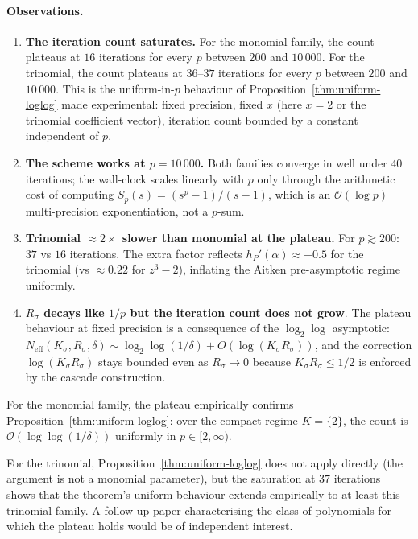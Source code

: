 \documentclass[11pt,a4paper]{article}
\theoremstyle{definition}
\begin{document}
\paragraph{Observations.}
\begin{enumerate}
  \item \textbf{The iteration count saturates.} For the monomial family, the count plateaus at $16$ iterations for every $p$ between $200$ and $10\,000$. For the trinomial, the count plateaus at $36$--$37$ iterations for every $p$ between $200$ and $10\,000$. This is the uniform-in-$p$ behaviour of Proposition~\ref{thm:uniform-loglog} made experimental: fixed precision, fixed $x$ (here $x = 2$ or the trinomial coefficient vector), iteration count bounded by a constant independent of $p$.
  \item \textbf{The scheme works at $p = 10\,000$.} Both families converge in well under $40$ iterations; the wall-clock scales linearly with $p$ only through the arithmetic cost of computing $S_p(s) = (s^p - 1)/(s - 1)$, which is an $\mathcal{O}(\log p)$ multi-precision exponentiation, not a $p$-sum.
  \item \textbf{Trinomial $\approx 2\times$ slower than monomial at the plateau.} For $p \gtrsim 200$: $37$ vs $16$ iterations. The extra factor reflects $h_P'(\alpha) \approx -0.5$ for the trinomial (vs $\approx 0.22$ for $z^3 - 2$), inflating the Aitken pre-asymptotic regime uniformly.
  \item \textbf{$R_\sigma$ decays like $1/p$ but the iteration count does not grow}. The plateau behaviour at fixed precision is a consequence of the $\log_2\log$ asymptotic: $N_{\mathrm{eff}}(K_\sigma, R_\sigma, \delta) \sim \log_2\log(1/\delta) + O(\log(K_\sigma R_\sigma))$, and the correction $\log(K_\sigma R_\sigma)$ stays bounded even as $R_\sigma \to 0$ because $K_\sigma R_\sigma \leq 1/2$ is enforced by the cascade construction.
\end{enumerate}

For the monomial family, the plateau empirically confirms Proposition~\ref{thm:uniform-loglog}: over the compact regime $K = \{2\}$, the count is $\mathcal{O}(\log\log(1/\delta))$ uniformly in $p \in [2, \infty)$.

For the trinomial, Proposition~\ref{thm:uniform-loglog} does not apply directly (the argument is not a monomial parameter), but the saturation at $37$ iterations shows that the theorem's uniform behaviour extends empirically to at least this trinomial family. A follow-up paper characterising the class of polynomials for which the plateau holds would be of independent interest.
\end{document}
